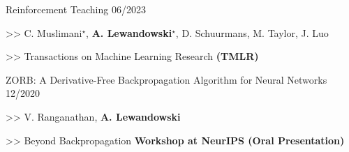 \begin{cventries}
    \pubentry
    {Reinforcement Teaching}
    {06/2023}
    {
      \begin{cvitems}
        \item[>>] C. Muslimani$^{\star}$, \textbf{A. Lewandowski}$^\star$, D. Schuurmans, M. Taylor, J. Luo
    	\item[>>] Transactions on Machine Learning Research \textbf{(TMLR)}
      \end{cvitems}
    }



    \pubentry
    {ZORB: A Derivative-Free Backpropagation Algorithm for Neural Networks}
    {12/2020}
    {
      \begin{cvitems}
        \item[>>] V. Ranganathan, \textbf{A. Lewandowski}
    	\item[>>] Beyond Backpropagation \textbf{Workshop at NeurIPS (Oral
      Presentation)}
      \end{cvitems}
    }




\end{cventries}
